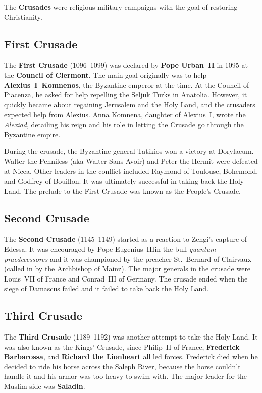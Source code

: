 The \textbf{Crusades} were religious military campaigns with the goal of restoring Christianity.

\subsection*{First Crusade}

The \textbf{First Crusade} (1096--1099) was declared by \textbf{Pope Urban~II}
in 1095 at the \textbf{Council of Clermont}.
The main goal originally was to help \textbf{Alexius~I~Komnenos}, the Byzantine emperor at the time.
At the Council of Piacenza, he asked for help repelling the Seljuk Turks in Anatolia.
However, it quickly became about regaining Jerusalem and the Holy Land,
and the crusaders expected help from Alexius.
Anna Komnena, daughter of Alexius~I, wrote the \textit{Alexiad},
detailing his reign and his role in letting the Crusade go through the Byzantine empire.

During the crusade, the Byzantine general Tatikios won a victory at Dorylaeum.
Walter the Penniless (aka Walter Sans Avoir) and Peter the Hermit were defeated at Nicea.
Other leaders in the conflict included Raymond of Toulouse, Bohemond, and Godfrey of Bouillon.
It was ultimately successful in taking back the Holy Land.
The prelude to the First Crusade was known as the People's Crusade.

\subsection*{Second Crusade}

The \textbf{Second Crusade} (1145--1149) started as a reaction to Zengi's capture of Edessa.
It was encouraged by Pope Eugenius~III\@ in the bull \textit{quantum praedecessores}
and it was championed by the preacher St.\ Bernard of Clairvaux (called in by the Archbishop of Mainz).
The major generals in the crusade were Louis~VII of France and Conrad~III of Germany.
The crusade ended when the siege of Damascus failed and it failed to take back the Holy Land.

\subsection*{Third Crusade}

The \textbf{Third Crusade} (1189--1192) was another attempt to take the Holy Land.
It was also known as the Kings' Crusade,
since Philip~II of France, \textbf{Frederick Barbarossa}, and \textbf{Richard the Lionheart} all led forces.
Frederick died when he decided to ride his horse across the Saleph River,
because the horse couldn't handle it and his armor was too heavy to swim with.
The major leader for the Muslim side was \textbf{Saladin}.

